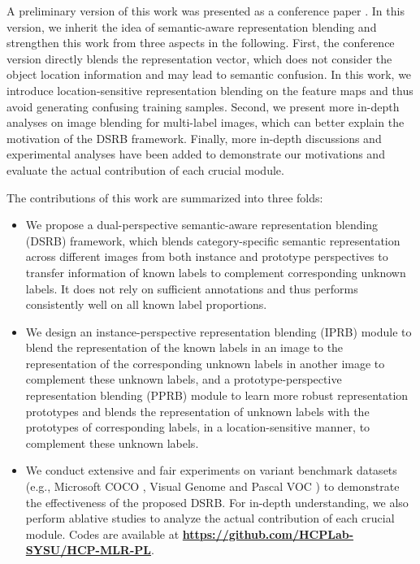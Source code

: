 \documentclass[lettersize,journal]{IEEEtran}
\begin{document}
A preliminary version of this work was presented as a conference paper \cite{Pu2022SARB}. In this version, we inherit the idea of semantic-aware representation blending and strengthen this work from three aspects in the following. First, the conference version directly blends the representation vector, which does not consider the object location information and may lead to semantic confusion. In this work, we introduce location-sensitive representation blending on the feature maps and thus avoid generating confusing training samples. Second, we present more in-depth analyses on image blending for multi-label images, which can better explain the motivation of the DSRB framework. Finally, more in-depth discussions and experimental analyses have been added to demonstrate our motivations and evaluate the actual contribution of each crucial module.

The contributions of this work are summarized into three folds: 
\begin{itemize}
\item We propose a dual-perspective semantic-aware representation blending (DSRB) framework, which blends category-specific semantic representation across different images from both instance and prototype perspectives to transfer information of known labels to complement corresponding unknown labels. It does not rely on sufficient annotations and thus performs consistently well on all known label proportions.

\item We design an instance-perspective representation blending (IPRB) module to blend the representation of the known labels in an image to the representation of the corresponding unknown labels in another image to complement these unknown labels, and a prototype-perspective representation blending (PPRB) module to learn more robust representation prototypes and blends the representation of unknown labels with the prototypes of corresponding labels, in a location-sensitive manner, to complement these unknown labels.

\item We conduct extensive and fair experiments on variant benchmark datasets (e.g., Microsoft COCO \cite{Lin2014COCO}, Visual Genome \cite{Krishna2017VG} and Pascal VOC \cite{Everingham2010Pascal}) to demonstrate the effectiveness of the proposed DSRB. For in-depth understanding, we also perform ablative studies to analyze the actual contribution of each crucial module. Codes are available at \textbf{\url{https://github.com/HCPLab-SYSU/HCP-MLR-PL}}.
\end{itemize}
\end{document}
